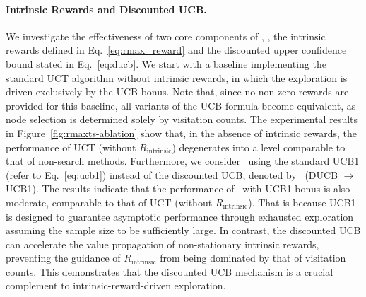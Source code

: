 \paragraph{Intrinsic Rewards and Discounted UCB.}
We investigate the effectiveness of two core components of \treesearch, \ie, the intrinsic rewards defined in Eq.~\eqref{eq:rmax_reward} and the discounted upper confidence bound stated in Eq.~\eqref{eq:ducb}.
We start with a baseline implementing the standard UCT algorithm \citep{kocsis2006bandit} without intrinsic rewards, in which the exploration is driven exclusively by the UCB bonus.
Note that, since no non-zero rewards are provided for this baseline, all variants of the UCB formula become equivalent, as node selection is determined solely by visitation counts.
The experimental results in Figure~\ref{fig:rmaxts-ablation} show that, in the absence of intrinsic rewards, the performance of UCT (without $R_{\text{intrinsic}}$) degenerates into a level comparable to that of non-search methods.
Furthermore, we consider \treesearch~using the standard UCB1 (refer to Eq.~\eqref{eq:ucb1}) instead of the discounted UCB, denoted by \treesearch~(DUCB $\rightarrow$ UCB1).
The results indicate that the performance of \treesearch~with UCB1 bonus is also moderate, comparable to that of UCT (without $R_{\text{intrinsic}}$).
That is because UCB1 is designed to guarantee asymptotic performance through exhausted exploration \citep{auer2002finite} assuming the sample size to be sufficiently large.
In contrast, the discounted UCB can accelerate the value propagation of non-stationary intrinsic rewards, preventing the guidance of $R_{\text{intrinsic}}$ from being dominated by that of visitation counts.
This demonstrates that the discounted UCB mechanism is a crucial complement to intrinsic-reward-driven exploration.

